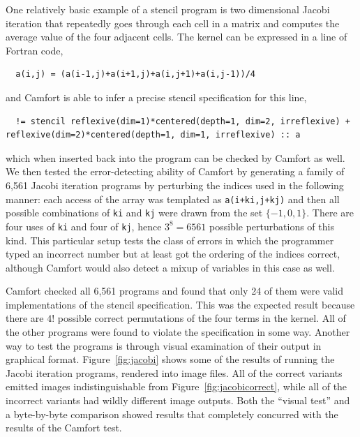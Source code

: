 \documentclass[9pt]{sigplanconf}
\theoremstyle{definition}
\begin{document}
One relatively basic example of a stencil program is two dimensional
Jacobi iteration that repeatedly goes through each cell in a matrix
and computes the average value of the four adjacent cells. The kernel
can be expressed in a line of Fortran code,
\begin{verbatim}
  a(i,j) = (a(i-1,j)+a(i+1,j)+a(i,j+1)+a(i,j-1))/4
\end{verbatim}
and Camfort is able to infer a precise stencil specification for this
line,
\begin{verbatim}
  != stencil reflexive(dim=1)*centered(depth=1, dim=2, irreflexive) + reflexive(dim=2)*centered(depth=1, dim=1, irreflexive) :: a
\end{verbatim}
which when inserted back into the program can be checked by Camfort as
well. We then tested the error-detecting ability of Camfort by
generating a family of 6,561 Jacobi iteration programs by perturbing
the indices used in the following manner: each access of the array was
templated as \texttt{a(i+ki,j+kj)} and then all possible
combinations of \texttt{ki} and \texttt{kj}
were drawn from the set $\{-1,0,1\}$. There are four uses of
\texttt{ki} and four of \texttt{kj}, hence
$3^8=6561$ possible perturbations of this kind. This particular setup
tests the class of errors in which the programmer typed an incorrect
number but at least got the ordering of the indices correct, although
Camfort would also detect a mixup of variables in this case as well.

Camfort checked all 6,561 programs and found that only 24 of them were
valid implementations of the stencil specification. This was the
expected result because there are $4!$ possible correct permutations
of the four terms in the kernel. All of the other programs were found
to violate the specification in some way. Another way to test the
programs is through visual examination of their output in graphical
format. Figure~\ref{fig:jacobi} shows some of the results of running
the Jacobi iteration programs, rendered into image files. All of the
correct variants emitted images indistinguishable from
Figure~\ref{fig:jacobicorrect}, while all of the incorrect variants
had wildly different image outputs. Both the ``visual test'' and a
byte-by-byte comparison showed results that completely concurred with
the results of the Camfort test.
\end{document}
